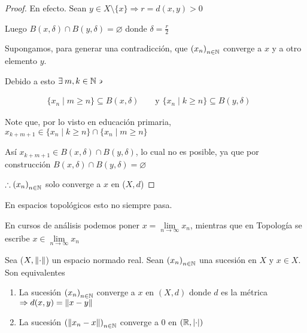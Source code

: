 \begin{proof}
    En efecto. Sean $y \in X \setminus \{ x \} \Rightarrow r = d(x,y) > 0$

    Luego $B(x,\delta) \cap B(y,\delta) = \varnothing$ donde $\delta = \frac{r}{2}$

    Supongamos, para generar una contradicción, que ${(x_n)}_{n \in \mathbb{N}}$ converge a $x$ y a otro elemento $y$.

    Debido a esto $\exists \: m,k \in \mathbb{N} \backepsilon$

    \begin{align*}
       \{ x_n \mid m \geqslant n \} \subseteq B(x,\delta) && \text{ y } \{ x_n \mid k \geqslant n \} \subseteq B(y,\delta) &&
    \end{align*}

    Note que, por lo visto en educación primaria, ${x}_{k+m+1} \in \{ x_n \mid k \geqslant n \} \cap \{ x_n \mid m \geqslant n \} $

    Así ${x}_{k+m+1} \in B(x,\delta) \cap B(y,\delta)$, lo cual no es posible, ya que por construcción $B(x,\delta) \cap B(y,\delta) = \varnothing$

    $\therefore {(x_n)}_{n \in \mathbb{N}}$ solo converge a $x$ en ($X,d$)
\end{proof}

\begin{remark}
    En espacios topológicos esto no siempre pasa. 
\end{remark}

\begin{corollary}
    En cursos de análisis podemos poner $x = \lim\limits_{n \to \infty} x_n$, mientras que en Topología se escribe $x \in \lim\limits_{n \to \infty} x_n$
\end{corollary}

\begin{theorem}
    Sea ($X, \norm{\cdot}$) un espacio normado real. Sean ${(x_n)}_{n \in \mathbb{N}}$ una sucesión en $X$ y $x \in X$. Son equivalentes

    \begin{enumerate}
        \item La sucesión ${(x_n)}_{n \in \mathbb{N}}$ converge a $x$ en $(X,d)$ donde $d$ es la métrica $\Rightarrow d(x,y) = \norm{x-y}$
        \item La sucesión ${(\norm{x_n-x})}_{n \in \mathbb{N}}$ converge a 0 en $(\mathbb{R}, \abs{\cdot})$
    \end{enumerate}
\end{theorem}

